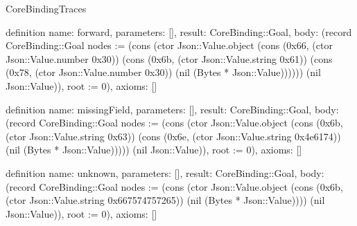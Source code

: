 \begin{lexlean}{CoreBindingTraces}
\begin{semanticmodule}
definition{
 name: forward,
 parameters: [],
 result: CoreBinding::Goal,
 body: (record CoreBinding::Goal {nodes := (cons (ctor Json::Value.object (cons (0x66, (ctor Json::Value.number 0x30)) (cons (0x6b, (ctor Json::Value.string 0x61)) (cons (0x78, (ctor Json::Value.number 0x30)) (nil (Bytes * Json::Value)))))) (nil Json::Value)), root := 0}),
 axioms: []
}

definition{
 name: missingField,
 parameters: [],
 result: CoreBinding::Goal,
 body: (record CoreBinding::Goal {nodes := (cons (ctor Json::Value.object (cons (0x6b, (ctor Json::Value.string 0x63)) (cons (0x6e, (ctor Json::Value.string 0x4e6174)) (nil (Bytes * Json::Value))))) (nil Json::Value)), root := 0}),
 axioms: []
}

definition{
 name: unknown,
 parameters: [],
 result: CoreBinding::Goal,
 body: (record CoreBinding::Goal {nodes := (cons (ctor Json::Value.object (cons (0x6b, (ctor Json::Value.string 0x667574757265)) (nil (Bytes * Json::Value)))) (nil Json::Value)), root := 0}),
 axioms: []
}


\end{semanticmodule}
\end{lexlean}
